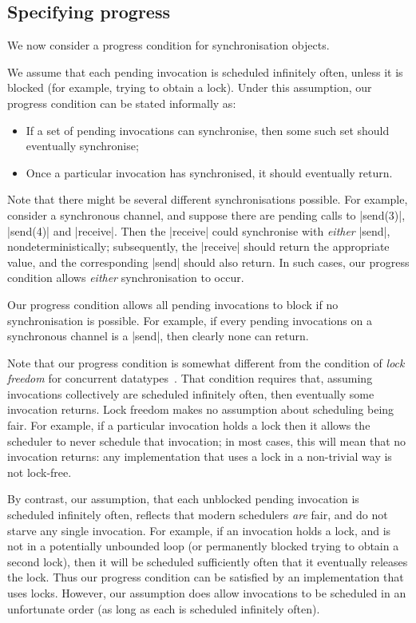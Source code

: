 
\subsection{Specifying progress}

We now consider a progress condition for synchronisation objects.  

We assume that each pending invocation is scheduled infinitely often, unless
it is blocked (for example, trying to obtain a lock).  Under this assumption,
our progress condition can be stated informally as:
%
\begin{itemize}
\item If a set of pending invocations can synchronise, then some such set
  should eventually synchronise;

\item Once a particular invocation has synchronised, it should eventually
  return.
\end{itemize}
%
Note that there might be several different synchronisations possible.  For
example, consider a synchronous channel, and suppose there are pending calls
to |send(3)|, |send(4)| and |receive|.  Then the |receive| could synchronise
with \emph{either} |send|, nondeterministically; subsequently, the |receive|
should return the appropriate value, and the corresponding |send| should also
return.  In such cases, our progress condition allows \emph{either}
synchronisation to occur.

Our progress condition allows all pending invocations to block if no
synchronisation is possible.  For example, if every pending invocations on a
synchronous channel is a |send|, then clearly none can return.

Note that our progress condition is somewhat different from the condition of
\emph{lock freedom} for concurrent datatypes~\cite{herlihy-shavit}.  That
condition requires that, assuming invocations collectively are scheduled
infinitely often, then eventually some invocation returns.  Lock freedom makes
no assumption about scheduling being fair.  For example, if a particular
invocation holds a lock then it allows the scheduler to never schedule that
invocation; in most cases, this will mean that no invocation returns: any
implementation that uses a lock in a non-trivial way is not lock-free.

By contrast, our assumption, that each unblocked pending invocation is
scheduled infinitely often, reflects that modern schedulers \emph{are} fair,
and do not starve any single invocation.  For example, if an invocation holds
a lock, and is not in a potentially unbounded loop (or permanently blocked
trying to obtain a second lock), then it will be scheduled
sufficiently often that it eventually releases the lock.  Thus our progress
condition can be satisfied by an implementation that uses locks.  However, our
assumption does allow invocations to be scheduled in an unfortunate order (as
long as each is scheduled infinitely often).

